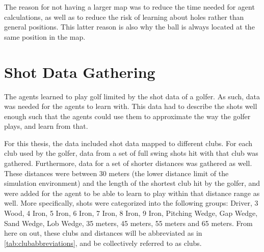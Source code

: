 \documentclass{kththesis}
\begin{document}
The reason for not having a larger map was to reduce the time needed for agent calculations, as well as to reduce the risk of learning about holes rather than general positions. This latter reason is also why the ball is always located at the same position in the map.

\section{Shot Data Gathering}
\label{sec:datagathering}
The agents learned to play golf limited by the shot data of a golfer. As such, data was needed for the agents to learn with. This data had to describe the shots well enough such that the agents could use them to approximate the way the golfer plays, and learn from that.

For this thesis, the data included shot data mapped to different clubs. For each club used by the golfer, data from a set of full swing shots hit with that club was gathered. Furthermore, data for a set of shorter distances was gathered as well. These distances were between 30 meters (the lower distance limit of the simulation environment) and the length of the shortest club hit by the golfer, and were added for the agent to be able to learn to play within that distance range as well. More specifically, shots were categorized into the following groups: Driver, 3 Wood, 4 Iron, 5 Iron, 6 Iron, 7 Iron, 8 Iron, 9 Iron, Pitching Wedge, Gap Wedge, Sand Wedge, Lob Wedge, 35 meters, 45 meters, 55 meters and 65 meters. From here on out, these clubs and distances will be abbreviated as in \autoref{tab:clubabbreviations}, and be collectively referred to as clubs.
\end{document}
